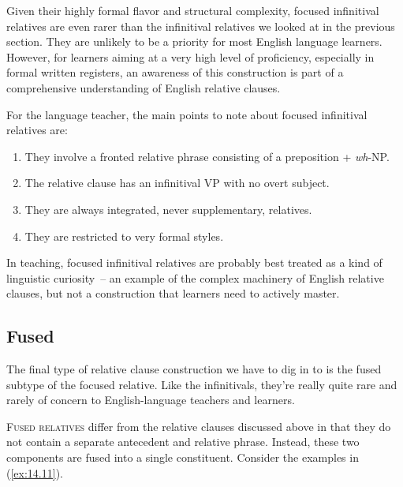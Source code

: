 Given their highly formal flavor and structural complexity, focused infinitival relatives are even rarer than the infinitival relatives we looked at in the previous section. They are unlikely to be a priority for most English language learners. However, for learners aiming at a very high level of proficiency, especially in formal written registers, an awareness of this construction is part of a comprehensive understanding of English relative clauses.

For the language teacher, the main points to note about focused infinitival relatives are:

\begin{enumerate}[noitemsep]
    \item They involve a fronted relative phrase consisting of a preposition + \textit{wh}-NP.
    \item The relative clause has an infinitival VP with no overt subject.
    \item They are always integrated, never supplementary, relatives.
    \item They are restricted to very formal styles.
\end{enumerate}

In teaching, focused infinitival relatives are probably best treated as a kind of linguistic curiosity~--  an example of the complex machinery of English relative clauses, but not a construction that learners need to actively master.

\subsection{Fused}

The final type of relative clause construction we have to dig in to is the fused subtype of the focused relative. Like the infinitivals, they're really quite rare and rarely of concern to English-language teachers and learners.

\textsc{Fused relatives} differ from the relative clauses discussed above in that they do not contain a separate antecedent and relative phrase. Instead, these two components are fused into a single constituent. Consider the examples in (\ref{ex:14.11}).

\ea \label{ex:14.11}
    \z
\z

